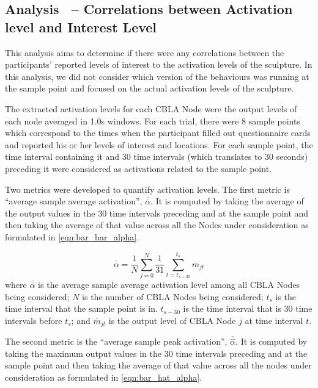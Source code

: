 \subsection{Analysis~ -- Correlations between Activation level and Interest Level} \label{sec:user-study-analysis-activations}

This analysis aims to determine if there were any correlations between the participants' reported levels of interest to the activation levels of the sculpture. In this analysis, we did not consider which version of the behaviours was running at the sample point and focused on the actual activation levels of the sculpture.

The extracted activation levels for each CBLA Node were the output levels of each node averaged in 1.0s windows. For each trial, there were 8 sample points which correspond to the times when the participant filled out questionnaire cards and reported his or her levels of interest and locations. For each sample point, the time interval containing it and 30 time intervals (which translates to 30 seconds) preceding it were considered as activations related to the sample point.

Two metrics were developed to quantify activation levels. The first metric is ``average sample average activation'',  $\overline{\overline{\alpha}}$. It is computed by taking the average of the output values in the 30 time intervals preceding and at the sample point and then taking the average of that value across all the Nodes under consideration as formulated in \eqref{eqn:bar_bar_alpha}.

\begin{equation}\label{eqn:bar_bar_alpha}
	\overline{\overline{\alpha}} = \frac{1}{N}\sum_{j=0}^{N}\frac{1}{31}\sum_{t=t_{s-30}}^{t_{s}}\overline{m}_{jt}
\end{equation}
where $\overline{\overline{\alpha}}$ is the average sample average activation level among all CBLA Nodes being considered; $N$ is the number of CBLA Nodes being considered; $t_s$ is the time interval that the sample point is in. $t_{s-30}$ is the time interval that is 30 time intervals before $t_s$; and $\overline{m}_{jt}$ is the output level of CBLA Node $j$ at time interval $t$. 

The second metric is the ``average sample peak activation'', $\overline{\widehat{\alpha}}$. It is computed by taking the maximum output values in the 30 time intervals preceding and at the sample point and then taking the average of that value across all the nodes under consideration as formulated in \eqref{eqn:bar_hat_alpha}.

